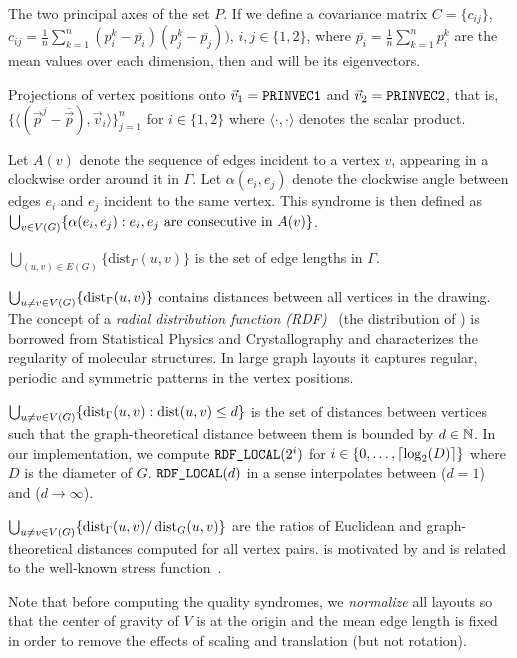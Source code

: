 \begin{explanation}
 The two principal axes of the set $P$.  If we define a covariance matrix
$C=\{c_{ij}\}$, $c_{ij}=\frac{1}{n}\sum_{k=1}^n{(p_i^k-\overline{p_i})(p_j^k-\overline{p_j})})$, $i, j \in \{1, 2\}$,
where $\overline{p_i}=\frac{1}{n}\sum_{k=1}^n{p_i^k}$ are the mean values over each dimension, then  and
 will be its eigenvectors.

 Projections of vertex positions onto $\vec{v}_1=\mbox{\text{\upshape\ttfamily PRINVEC1}}$ and
$\vec{v}_2=\mbox{\text{\upshape\ttfamily PRINVEC2}}$, that is, ~$\{\langle\left(\vec{p}^j-\overline{\vec{p}}\right),\vec{v}_i\rangle\}_{j=1}^n$
for $i\in\{1,2\}$ where $\langle\cdot,\cdot\rangle$ denotes the scalar product.

 Let $A(v)$ denote the sequence of edges incident to a vertex $v$, appearing in a clockwise
order around it in $\Gamma$.  Let $\alpha(e_i,e_j)$ denote the clockwise angle between edges $e_i$ and $e_j$ incident to
the same vertex.  This syndrome is then defined as $\bigcup_{v\in{}V(G)}\{\alpha(e_i,e_j):{}e_i,e_j\text{ are
  consecutive in }A(v)\}$.

 $\bigcup_{(u,v)\in{}E(G)}\{\textrm{dist}_\Gamma(u,v)\}$ is the set of edge lengths in
$\Gamma$.

 $\bigcup_{u\neq{}v\in{}V(G)}\{\operatorname{dist}_\Gamma(u,v)\}$ contains distances between all vertices
in the drawing.  The concept of a \emph{radial distribution function (RDF)}~\cite{Findenegg2015} (the distribution of
) is borrowed from Statistical Physics and Crystallography and characterizes the regularity of
molecular structures.  In large graph layouts it captures regular, periodic and symmetric patterns in the vertex
positions.

 $\bigcup_{u\neq{}v\in{}V(G)}\{\operatorname{dist}_\Gamma(u,v):\operatorname{dist}(u,v)\leq{}d\}$ is the set of
distances between vertices such that the graph-theoretical distance between them is bounded by $d\in\mathbb{N}$.  In our
implementation, we compute $\mbox{\text{\upshape\ttfamily RDF\_LOCAL}}(2^i)$ for $i\in\{0,\ldots,\left\lceil\log_2(D)\right\rceil\}$ where $D$ is the diameter
of $G$.  $\mbox{\text{\upshape\ttfamily RDF\_LOCAL}}(d)$ in a sense interpolates between  ($d=1$) and 
($d\to\infty$).

 $\bigcup_{u\neq{}v\in{}V(G)}\{\operatorname{dist}_\Gamma(u,v)/\operatorname{dist}_G(u,v)\}$ are the ratios of Euclidean and
graph-theoretical distances computed for all vertex pairs.   is motivated by and is related to the
well-known stress function~\cite{Kamada1989}.
\end{explanation}

\noindent
Note that before computing the quality syndromes, we \emph{normalize} all layouts so that the center of gravity of $V$
is at the origin and the mean edge length is fixed in order to remove the effects of scaling and translation (but not
rotation).
